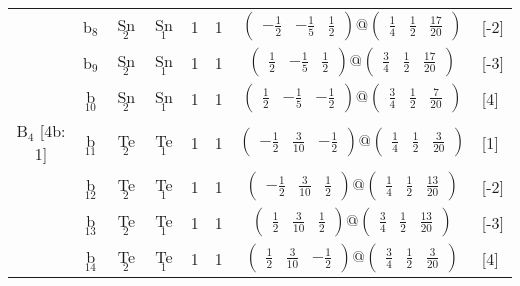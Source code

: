 \documentclass[fleqn,10pt,landscape]{article}
\begin{document}
\begin{itemize}
\begin{center}
\begin{longtable}{cc|cc|c|c|c|l}
& b$_{8}$ & Sn$_{2}$ & Sn$_{1}$ & 1 & 1 & $\begin{pmatrix} - \frac{1}{2} & - \frac{1}{5} & \frac{1}{2} \end{pmatrix}@\begin{pmatrix} \frac{1}{4} & \frac{1}{2} & \frac{17}{20} \end{pmatrix}$ & [-2] \\
& b$_{9}$ & Sn$_{2}$ & Sn$_{1}$ & 1 & 1 & $\begin{pmatrix} \frac{1}{2} & - \frac{1}{5} & \frac{1}{2} \end{pmatrix}@\begin{pmatrix} \frac{3}{4} & \frac{1}{2} & \frac{17}{20} \end{pmatrix}$ & [-3] \\
& b$_{10}$ & Sn$_{2}$ & Sn$_{1}$ & 1 & 1 & $\begin{pmatrix} \frac{1}{2} & - \frac{1}{5} & - \frac{1}{2} \end{pmatrix}@\begin{pmatrix} \frac{3}{4} & \frac{1}{2} & \frac{7}{20} \end{pmatrix}$ & [4] \\ \hline
B$_{4}$ [4b: 1] & b$_{11}$ & Te$_{2}$ & Te$_{1}$ & 1 & 1 & $\begin{pmatrix} - \frac{1}{2} & \frac{3}{10} & - \frac{1}{2} \end{pmatrix}@\begin{pmatrix} \frac{1}{4} & \frac{1}{2} & \frac{3}{20} \end{pmatrix}$ & [1] \\
& b$_{12}$ & Te$_{2}$ & Te$_{1}$ & 1 & 1 & $\begin{pmatrix} - \frac{1}{2} & \frac{3}{10} & \frac{1}{2} \end{pmatrix}@\begin{pmatrix} \frac{1}{4} & \frac{1}{2} & \frac{13}{20} \end{pmatrix}$ & [-2] \\
& b$_{13}$ & Te$_{2}$ & Te$_{1}$ & 1 & 1 & $\begin{pmatrix} \frac{1}{2} & \frac{3}{10} & \frac{1}{2} \end{pmatrix}@\begin{pmatrix} \frac{3}{4} & \frac{1}{2} & \frac{13}{20} \end{pmatrix}$ & [-3] \\
& b$_{14}$ & Te$_{2}$ & Te$_{1}$ & 1 & 1 & $\begin{pmatrix} \frac{1}{2} & \frac{3}{10} & - \frac{1}{2} \end{pmatrix}@\begin{pmatrix} \frac{3}{4} & \frac{1}{2} & \frac{3}{20} \end{pmatrix}$ & [4] \\
\end{longtable}
\end{center}


\end{itemize}
\end{document}
